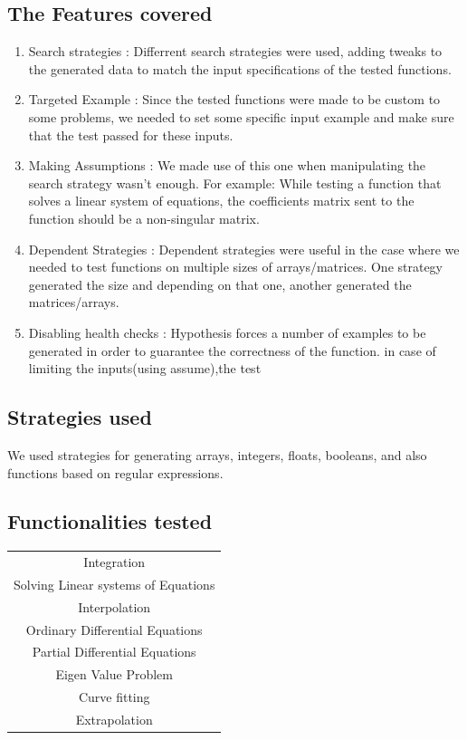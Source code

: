 \documentclass[12pt]{article}
\begin{document}
{\subsection{The Features covered}
\begin{enumerate}
	\item Search strategies : Differrent search strategies were used, adding tweaks to the generated data to match the input specifications of the tested functions.
	\item Targeted Example  : Since the tested functions were made to be custom to some problems, we needed to set some specific input example and make sure that the test passed for these inputs.
	\item Making Assumptions : We made use of this one when manipulating the search strategy wasn't enough. For example: While testing a function that solves a linear system of equations, the coefficients matrix sent to the function should be a non-singular matrix.
	\item Dependent Strategies : Dependent strategies were useful in the case where we needed to test functions on multiple sizes of arrays/matrices. One strategy generated the size and depending on that one, another generated the matrices/arrays.
	\item Disabling health checks : Hypothesis forces a number of examples to be generated in order to guarantee the correctness of the function. in case of limiting the inputs(using assume),the test  
\end{enumerate}
\subsection{Strategies used}
We used strategies for generating arrays, integers, floats, booleans, and also functions based on regular expressions. 
\subsection{Functionalities tested}
\begin{center}
	\begin{tabular}{ |c| } 
		\hline
		Integration \\ 
		Solving Linear systems of Equations \\ 
		Interpolation \\ 
		Ordinary Differential Equations \\
		Partial Differential Equations \\
		Eigen Value Problem \\
		Curve fitting \\
		Extrapolation \\
		

\end{tabular}
\end{center}}
\end{document}
